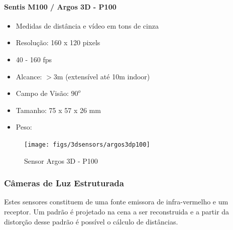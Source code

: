 \paragraph{Sentis M100 / Argos 3D - P100}

\begin{itemize}
  \item Medidas de distância e vídeo em tons de cinza
  \item Resolução: 160 x 120 pixels
  \item 40 - 160 fps
  \item Alcance: $>$3m  (extensível até 10m indoor)
  \item Campo de Visão: $90^o$
  \item Tamanho: 75 x 57 x 26 mm
  \item Peso:
\end{itemize}

\begin{figure}[h!]
   \centering
   \texttt{[image: figs/3dsensors/argos3dp100]}
   \caption{Sensor Argos 3D - P100}
   \label{fig::forecast}
\end{figure}

\subsubsection{Câmeras de Luz Estruturada}

Estes sensores constituem de uma fonte emissora de infra-vermelho e um receptor.
Um padrão é projetado na cena a ser reconstruida e a partir da distorção desse
padrão é possível o cálculo de distâncias. 



